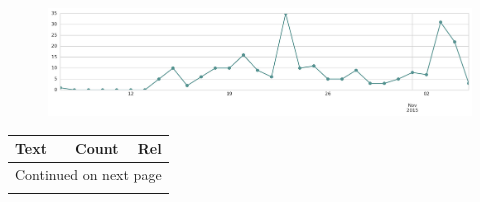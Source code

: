 \begin{figure}[htbp!]
    \centering
    \includegraphics[width=\textwidth]{twitter_all/report_images/topic-07-timeseries.jpg}
\end{figure}

\begin{longtable}{p{12.5cm}rr}
\toprule
Text & Count & Rel \\
\midrule
\endhead
\midrule
\multicolumn{3}{r}{{Continued on next page}} \\
\midrule
\endfoot


\end{longtable}
